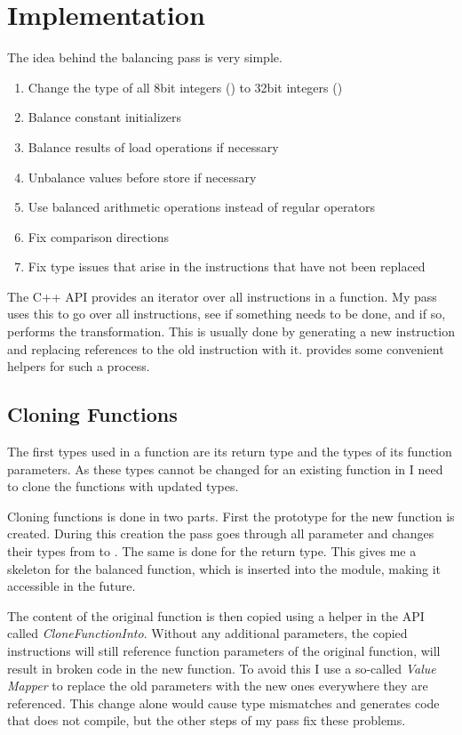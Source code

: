\section{Implementation}
\label{pass}
The idea behind the balancing pass is very simple.
\begin{enumerate}
\item Change the type of all 8bit integers () to 32bit integers ()
\item Balance constant initializers
\item Balance results of load operations if necessary
\item Unbalance values before store if necessary
\item Use balanced arithmetic operations instead of regular operators
\item Fix comparison directions
\item Fix type issues that arise in the instructions that have not been replaced
\end{enumerate}

The \llvm{} C++ API provides an iterator over all instructions in a function.
My pass uses this to go over all instructions, see if something needs to be done, and if so, performs the transformation.
This is usually done by generating a new \ir{} instruction and replacing references to the old instruction with it.
\llvm{} provides some convenient helpers for such a process.

\subsection{Cloning Functions}
The first types used in a function are its return type and the types of its function parameters.
As these types cannot be changed for an existing function in \llvm{} I need to clone the functions with updated types.

Cloning functions is done in two parts.
First the prototype for the new function is created.
During this creation the pass goes through all parameter and changes their types from  to .
The same is done for the return type.
This gives me a skeleton for the balanced function, which is inserted into the module, making it accessible in the future.

The content of the original function is then copied using a helper in the \llvm{} API called \emph{CloneFunctionInto}.
Without any additional parameters, the copied instructions will still reference function parameters of the original function, will result in broken code in the new function.
To avoid this I use a so-called \emph{Value Mapper} to replace the old parameters with the new ones everywhere they are referenced.
This change alone would cause type mismatches and generates code that does not compile, but the other steps of my pass fix these problems.

